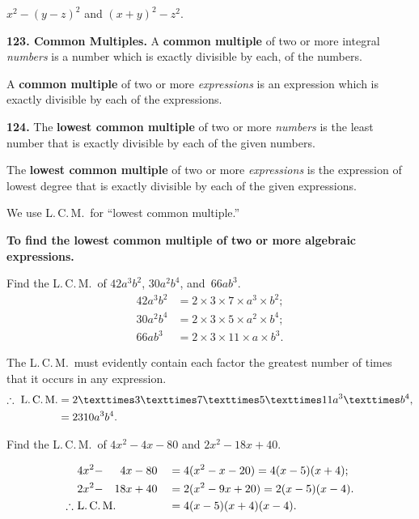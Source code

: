 \documentclass[12pt]{book}[2005/09/16]
\newcommand{\Paragraph}[1]{\medskip\par\textbf{#1}}
\newcommand{\Defn}[1]{\textbf{#1}}
\newenvironment{Soln}[1][]{\par\small\textsc{#1}}{\par}
\newcommand{\Item}[1]{\vspace{4pt plus 16pt}\makebox[1em][r]{\textbf{#1}\ }}
\newcommand{\LCM}{L.\,C.\,M.}
\begin{document}
\Item{28.}  $x^{2} - (y - z)^{2}$ and $(x + y)^{2} - z^{2}$.

\Paragraph{123.  Common Multiples.}  A \Defn{common multiple} of two or
more integral \emph{numbers} is a number which is exactly divisible
by each, of the numbers.

A \Defn{common multiple} of two or more \emph{expressions} is an expression
which is exactly divisible by each of the expressions.

\Paragraph{124.}  The \Defn{lowest common multiple} of two or more \emph{numbers}
is the least number that is exactly divisible by each of the
given numbers.

The \Defn{lowest common multiple} of two or more \emph{expressions} is
the expression of lowest degree that is exactly divisible by
each of the given expressions.

We use \LCM\ for ``lowest common multiple.''

\Paragraph{To find the lowest common multiple of two or more algebraic
expressions.}

\Item{1.}  Find the \LCM\ of $42a^{3}b^{2}$, $30a^{2}b^{4}$, and~$66ab^{3}$.
\begin{align*}
42a^{3}b^{2} &= 2 × 3 × 7 × a^{3} × b^{2}; \\
30a^{2}b^{4} &= 2 × 3 × 5 × a^{2} × b^{4}; \\
66ab^{3} &= 2 × 3 × 11 × a × b^{3}.
\end{align*}

\begin{Soln}
The \LCM\  must evidently contain each factor the greatest number
of times that it occurs in any expression.
\begin{align*}
\therefore\ \text{\LCM}
  &= 2 × 3 × 7 × 5 × 11a^{3} × b^{4}, \\
  &= 2310a^{3}b^{4}.
\end{align*}
\end{Soln}

\Item{2.}  Find the \LCM\ of $4x^{2} - 4x - 80$ and $2x^{2} - 18x + 40$.
\begin{Soln}
\begin{alignat*}{3}
&4x^{2} -&  4x &- 80 &&= 4(x^{2} - x - 20) = 4(x - 5)(x + 4); \\
&2x^{2} -& 18x &+ 40 &&= 2(x^{2} - 9x + 20) = 2(x - 5)(x - 4). \\
\therefore\ &\rlap{\text{\LCM}}&&& &= 4(x - 5)(x + 4)(x - 4).
\end{alignat*}
\end{Soln}
\end{document}

